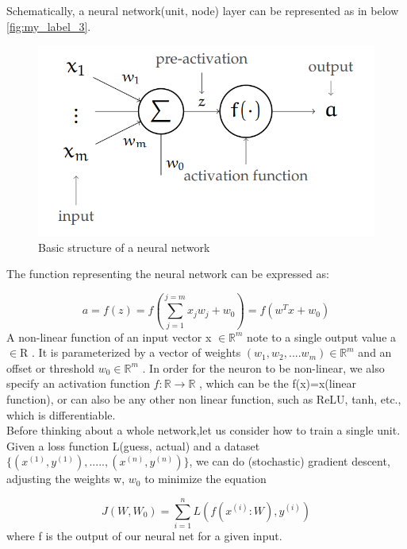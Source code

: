 Schematically, a neural network(unit, node) layer can be represented as in below \autoref{fig:my_label_3}. 
\begin{figure}[H]
    \centering
    \includegraphics[scale =0.5]{Figure/ml__1.png}
    \caption{Basic structure of a neural network\cite{https://doi.org/10.48550/arxiv.1506.00619}}
    \label{fig:my_label_3}
\end{figure}




The function representing the neural network can be expressed as:

\begin{equation}\label{eq:eq1}
a= f(z) = f(\sum_{j=1}^{j=m} x_jw_j +w_0) = f(w^T x+w_0)
\end{equation}
A non-linear function of an input vector x $\in \mathbb{R}^m$ note to a single output value  a $\in$R . It is parameterized by a vector of weights  $(w_1, w_2,....w_m)\in \mathbb{R}^m$  and an offset or threshold  $w_0\in \mathbb{R}^m$ . In order for the neuron to be non-linear, we also specify an activation function  $f:\mathbb{R} \to \mathbb{R}$ , which can be the f(x)=x(linear function), or can also be any other non linear function, such as ReLU, tanh, etc., which is differentiable. 
\\
Before thinking about a whole network,let us consider how to train a single unit. \\
Given a loss function L(guess, actual) and a dataset $\{(x^{(1)},y^{(1)}),.....,(x^{(n)},y^{(n)})\}$, we can do (stochastic) gradient descent, adjusting the weights w, $w_0$ to minimize the equation \cite{LeCun2015}

\begin{equation} \label{eq:eq2}
    J(W, W_0) = \sum_{i=1} ^n L(f(x^{(i)}:W),y^{(i)})
\end{equation}
where f is the output of our neural net for a given input.

